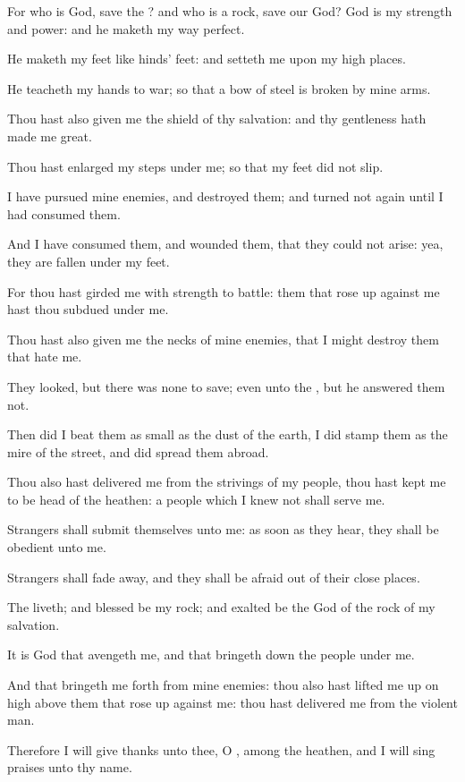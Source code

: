 \Verse For who is God, save the \LORD? and who is a rock, save our God?  \Verse God is my strength and power: and he maketh my way perfect.

\Verse He maketh my feet like hinds' feet: and setteth me upon my high places.

\Verse He teacheth my hands to war; so that a bow of steel is broken by mine arms.

\Verse Thou hast also given me the shield of thy salvation: and thy gentleness hath made me great.

\Verse Thou hast enlarged my steps under me; so that my feet did not slip.

\Verse I have pursued mine enemies, and destroyed them; and turned not again until I had consumed them.

\Verse And I have consumed them, and wounded them, that they could not arise: yea, they are fallen under my feet.

\Verse For thou hast girded me with strength to battle: them that rose up against me hast thou subdued under me.

\Verse Thou hast also given me the necks of mine enemies, that I might destroy them that hate me.

\Verse They looked, but there was none to save; even unto the \LORD, but he answered them not.

\Verse Then did I beat them as small as the dust of the earth, I did stamp them as the mire of the street, and did spread them abroad.

\Verse Thou also hast delivered me from the strivings of my people, thou hast kept me to be head of the heathen: a people which I knew not shall serve me.

\Verse Strangers shall submit themselves unto me: as soon as they hear, they shall be obedient unto me.

\Verse Strangers shall fade away, and they shall be afraid out of their close places.

\Verse The \LORD liveth; and blessed be my rock; and exalted be the God of the rock of my salvation.

\Verse It is God that avengeth me, and that bringeth down the people under me.

\Verse And that bringeth me forth from mine enemies: thou also hast lifted me up on high above them that rose up against me: thou hast delivered me from the violent man.

\Verse Therefore I will give thanks unto thee, O \LORD, among the heathen, and I will sing praises unto thy name.

